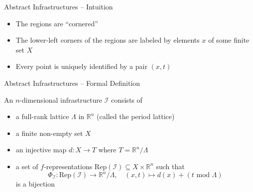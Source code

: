 \documentclass{beamer}
\newcommand{\R}{\mathbb{R}}
\newcommand{\cI}{\mathcal{I}}
\newcommand{\Rep}{\mathrm{Rep}}
\renewcommand{\>}{\rangle}
\newcommand{\<}{\langle}
\begin{document}
\begin{frame}{Abstract Infrastructures -- Intuition}
\begin{center}
   \end{center}
   \begin{itemize}
   \item The regions are ``cornered''

   \medskip
   \item The lower-left corners of the regions are labeled by elements $x$ of some finite set $X$
   
   \medskip
   \item Every point is uniquely identified by a pair $(x,t)$
   \end{itemize}
\end{frame}



\begin{frame}{Abstract Infrastructures -- Formal Definition}

An $n$-dimensional infrastructure $\mathcal{I}$ consists of

\begin{itemize}
\item a full-rank lattice $\Lambda$ in $\R^n$ (called the period lattice)

\medskip
\item a finite non-empty set $X$

\medskip
\item an injective map $d : X \rightarrow T$ where $T=\R^n/\Lambda$

\medskip
\item a set of $f$-representations $\mathrm{Rep}(\mathcal{I})\subseteq X\times \R^n$
such that 
\[
\Phi_\cI : \Rep(\cI) \rightarrow \R^n/\Lambda, \quad (x,t) \mapsto d(x) + (t \mbox{ mod } \Lambda)
\]
is a bijection

\end{itemize}
\end{frame}

\end{document}
